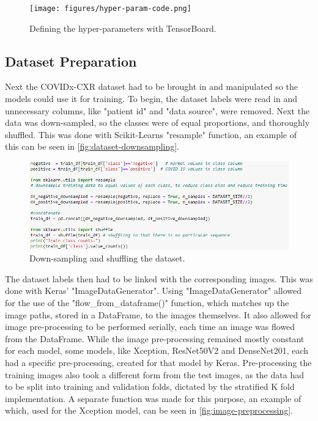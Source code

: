 \begin{figure}[H]
    \centering
    \texttt{[image: figures/hyper-param-code.png]}
    \caption{Defining the hyper-parameters with TensorBoard.}
    \label{fig:hyper-param-code}
\end{figure}

\subsection{Dataset Preparation}
Next the COVIDx-CXR dataset had to be brought in and manipulated so the models could use it for training. To begin, the dataset labels were read in and unnecessary columns, like "patient id" and "data source", were removed. Next the data was down-sampled, so the classes were of equal proportions, and thoroughly shuffled. This was done with Scikit-Learns "resample" function, an example of this can be seen in \autoref{fig:dataset-downsampling}. 

\begin{figure}[H]
    \centering
    \includegraphics[width=\textwidth]{figures/dataset-downsampling.png}
    \caption{Down-sampling and shuffling the dataset.}
    \label{fig:dataset-downsampling}
\end{figure}

The dataset labels then had to be linked with the corresponding images. This was done with Keras' "ImageDataGenerator". Using "ImageDataGenerator" allowed for the use of the "flow\_from\_dataframe()" function, which matches up the image paths, stored in a DataFrame, to the images themselves. It also allowed for image pre-processing to be performed serially, each time an image was flowed from the DataFrame. While the image pre-processing remained mostly constant for each model, some models, like Xception, ResNet50V2 and DenseNet201, each had a specific pre-processing, created for that model by Keras. Pre-processing the training images also took a different form from the test images, as the data had to be split into training and validation folds, dictated by the stratified K fold implementation. A separate function was made for this purpose, an example of which, used for the Xception model, can be seen in \autoref{fig:image-preprocessing}.


